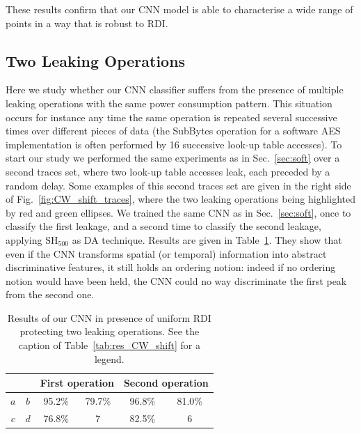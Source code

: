 These results confirm that our CNN model is able to characterise a wide range of points in a way that is robust to RDI. 

\subsection{Two Leaking Operations}
Here we study whether our CNN classifier suffers from the presence of multiple leaking operations with the same power consumption pattern. This situation occurs for instance any time the same operation is repeated several successive times over different pieces of data (\eg the SubBytes operation for a software AES implementation is often performed by 16 successive look-up table accesses). To start our study we performed the same experiments as in Sec.~\ref{sec:soft} over a second traces set, where two look-up table accesses leak, each preceded by a random delay. Some examples of this second traces set are given in the right side of Fig.~\ref{fig:CW_shift_traces}, where the two leaking operations being highlighted by red and green ellipses. We trained the same CNN as in Sec.~\ref{sec:soft}, once to classify the first leakage, and a second time to classify the second leakage, applying $\mathrm{SH}_{500}$ as DA technique. Results are given in Table~\ref{tab:label}. They show that even if the CNN transforms spatial (or temporal) information into abstract discriminative features, it still holds an ordering notion: indeed if no ordering notion would have been held, the CNN could no way discriminate the first peak from the second one. 


\begin{table}[]
\centering
\caption[Results of our CNN in presence of uniform RDI protecting two leaking operations.]{Results of our CNN in presence of uniform RDI protecting two leaking operations. See the caption of Table~\ref{tab:res_CW_shift} for a legend.}
\label{tab:label}
\begin{tabular}{|c|c|c|c|c|c|}
\hline
\multicolumn{2}{|c|}{} & \multicolumn{2}{c|}{First operation} & \multicolumn{2}{c|}{Second operation} \\ \hline
$a$        & $b$       & 95.2\%            & 79.7\%           & 96.8\%            & 81.0\%            \\ \hline
$c$        & $d$       & 76.8\%            & 7                & 82.5\%            & 6                 \\ \hline
\end{tabular}
\end{table}




